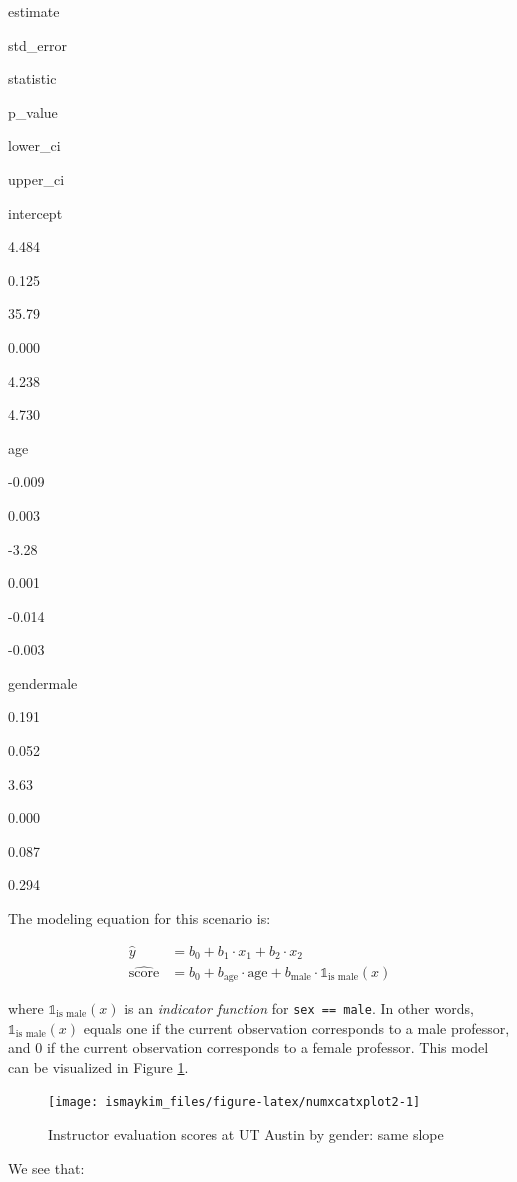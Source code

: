 \documentclass[12pt,]{krantz}
\begin{document}
estimate

std\_error

statistic

p\_value

lower\_ci

upper\_ci

intercept

4.484

0.125

35.79

0.000

4.238

4.730

age

-0.009

0.003

-3.28

0.001

-0.014

-0.003

gendermale

0.191

0.052

3.63

0.000

0.087

0.294

The modeling equation for this scenario is:

\begin{align}
\widehat{y} &= b_0 + b_1 \cdot x_1 + b_2 \cdot x_2 \\
\widehat{\mbox{score}} &= b_0 + b_{\mbox{age}} \cdot \mbox{age} + b_{\mbox{male}} \cdot \mathbb{1}_{\mbox{is male}}(x)
\end{align}

where \(\mathbb{1}_{\mbox{is male}}(x)\) is an \emph{indicator function}
for \texttt{sex\ ==\ male}. In other words,
\(\mathbb{1}_{\mbox{is male}}(x)\) equals one if the current observation
corresponds to a male professor, and 0 if the current observation
corresponds to a female professor. This model can be visualized in
Figure \ref{fig:numxcatxplot2}.

\begin{figure}

{\centering \texttt{[image: ismaykim\_files/figure-latex/numxcatxplot2-1]} 

}

\caption{Instructor evaluation scores at UT Austin by gender: same slope}\label{fig:numxcatxplot2}
\end{figure}

We see that:
\end{document}

